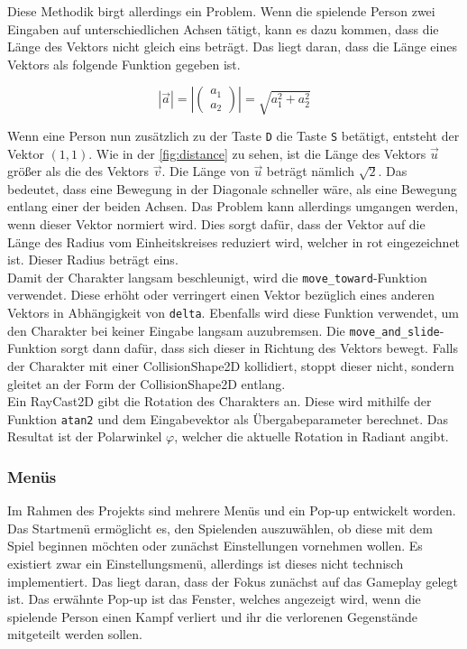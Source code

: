 Diese Methodik birgt allerdings ein Problem. Wenn die spielende Person zwei Eingaben auf unterschiedlichen Achsen tätigt, kann es dazu kommen, dass die Länge des Vektors nicht gleich eins beträgt. Das liegt daran, dass die Länge eines Vektors als folgende Funktion gegeben ist\cite[S.16]{vector-math}.

\setcounter{equation}{0}
\begin{equation}
    |\vec{a}| = |\left(\begin{array}{c} a_1 \\ a_2 \end{array}\right)| = \sqrt{a_1^2 + a_2^2} 
\end{equation}

Wenn eine Person nun zusätzlich zu der Taste \texttt{D} die Taste \texttt{S} betätigt, entsteht der Vektor $(1, 1)$. Wie in der \autoref{fig:distance} zu sehen, ist die Länge des Vektors $\vec{u}$ größer als die des Vektors $\vec{v}$. Die Länge von $\vec{u}$ beträgt nämlich $\sqrt{2}$. Das bedeutet, dass eine Bewegung in der Diagonale schneller wäre, als eine Bewegung entlang einer der beiden Achsen. Das Problem kann allerdings umgangen werden, wenn dieser Vektor normiert wird\cite[S.22]{vector-math}. Dies sorgt dafür, dass der Vektor auf die Länge des Radius vom Einheitskreises reduziert wird, welcher in rot eingezeichnet ist. Dieser Radius beträgt eins.\\

Damit der Charakter langsam beschleunigt, wird die \texttt{move\_toward}-Funktion verwendet\cite{godot-move-toward}. Diese erhöht oder verringert einen Vektor bezüglich eines anderen Vektors in Abhängigkeit von \texttt{delta}. Ebenfalls wird diese Funktion verwendet, um den Charakter bei keiner Eingabe langsam auzubremsen. Die \texttt{move\_and\_slide}-Funktion sorgt dann dafür, dass sich dieser in Richtung des Vektors bewegt\cite{godot-move-and-slide}. Falls der Charakter mit einer CollisionShape2D kollidiert, stoppt dieser nicht, sondern gleitet an der Form der CollisionShape2D entlang.\\

Ein RayCast2D gibt die Rotation des Charakters an. Diese wird mithilfe der Funktion \texttt{atan2} und dem Eingabevektor als Übergabeparameter berechnet\cite{godot-builtins}. Das Resultat ist der Polarwinkel $\varphi$, welcher die aktuelle Rotation in Radiant angibt.\\

\subsubsection{Menüs}
Im Rahmen des Projekts sind mehrere Menüs und ein Pop-up entwickelt worden. Das Startmenü ermöglicht es, den Spielenden auszuwählen, ob diese mit dem Spiel beginnen möchten oder zunächst Einstellungen vornehmen wollen. Es existiert zwar ein Einstellungsmenü, allerdings ist dieses nicht technisch implementiert. Das liegt daran, dass der Fokus zunächst auf das Gameplay gelegt ist. Das erwähnte Pop-up ist das Fenster, welches angezeigt wird, wenn die spielende Person einen Kampf verliert und ihr die verlorenen Gegenstände mitgeteilt werden sollen. \\

